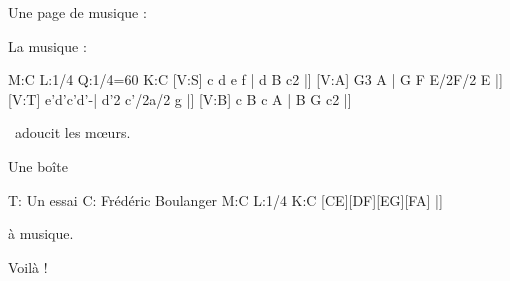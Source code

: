 \documentclass[a4paper]{article}
\begin{document}
Une page de musique :

%
%
\noindent La musique :
\begin{abcsvg}
  M:C
  L:1/4
  Q:1/4=60
  K:C
  [V:S] c d e f  | d B c2        |]
  [V:A] G3    A  | G F E/2F/2  E |]
  [V:T] e'd'c'd'-| d'2 c'/2a/2 g |]
  [V:B] c B c A  | B G c2        |]
\end{abcsvg}
\ adoucit les mœurs.

\noindent Une boîte 
%
\begin{abcsvgbox}{\mybox}
  T: Un essai
  C: Frédéric Boulanger
  M:C
  L:1/4
  K:C
  [CE][DF][EG][FA] |]
\end{abcsvgbox}
à musique.

Voilà !
\end{document}
